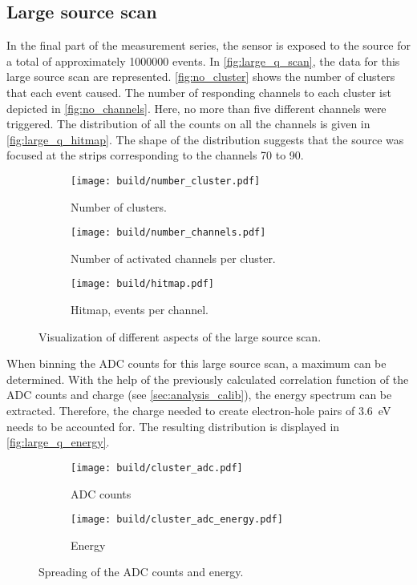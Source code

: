 \subsection{Large source scan}
\label{sec:large_q}
In the final part of the measurement series, the sensor is exposed to the source for a total of approximately \num{1000000} events. In \autoref{fig:large_q_scan}, 
the data for this large source scan are represented. \autoref{fig:no_cluster} shows the number of clusters that each event caused. The number of responding channels
to each cluster ist depicted in \autoref{fig:no_channels}. Here, no more than five different channels were triggered. The distribution of all the counts on all the
channels is given in \autoref{fig:large_q_hitmap}. The shape of the distribution suggests that the source was focused at the strips corresponding to the channels
70 to 90.
\begin{figure}
    \centering
    \begin{subfigure}{0.49\textwidth}
      \texttt{[image: build/number\_cluster.pdf]}
      \caption{Number of clusters.}
      \label{fig:no_cluster}
    \end{subfigure}
    \hfill
    \begin{subfigure}{0.49\textwidth}
      \texttt{[image: build/number\_channels.pdf]}
      \caption{Number of activated channels per cluster.}
      \label{fig:no_channels}
    \end{subfigure}
    \vfill
    \begin{subfigure}{0.49\textwidth}
        \texttt{[image: build/hitmap.pdf]}
        \caption{Hitmap, events per channel.}
        \label{fig:large_q_hitmap}
      \end{subfigure}
    \caption{Visualization of different aspects of the large source scan.}
    \label{fig:large_q_scan}
  \end{figure}

  When binning the ADC counts for this large source scan, a maximum can be determined. With the help of the previously calculated correlation function of the 
  ADC counts and charge (see \autoref{sec:analysis_calib}), the energy spectrum can be extracted. Therefore, the charge needed to create electron-hole pairs of
  \qty{3.6}{\electronvolt} needs to be accounted for. The resulting distribution is displayed in \autoref{fig:large_q_energy}.

  \begin{figure}
    \centering
    \begin{subfigure}{0.49\textwidth}
        \texttt{[image: build/cluster\_adc.pdf]}
        \caption{ADC counts}
        \label{fig:large_q_adc}
    \end{subfigure}
    \hfill
    \begin{subfigure}{0.49\textwidth}
        \texttt{[image: build/cluster\_adc\_energy.pdf]}
        \caption{Energy}
        \label{fig:large_q_energy}
    \end{subfigure}
    \caption{Spreading of the ADC counts and energy.}
    \label{fig:large_q_adc_energy}
\end{figure}

